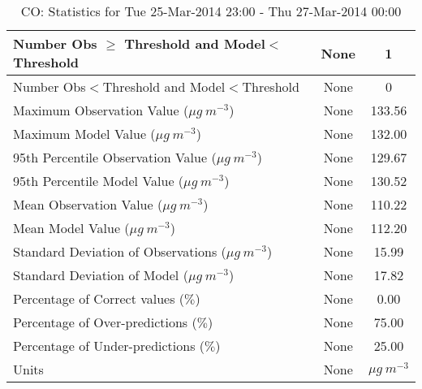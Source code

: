 \begin{table}
\begin{center}
\begin{tabular}{|l|c|c|}
 Number Obs $\geq$ Threshold and Model$<$Threshold &      None &         1 \\  \hline
 Number Obs$<$Threshold and Model$<$Threshold  &      None &         0 \\  \hline
 Maximum Observation Value ($\mu g\ m^{-3}$)   &      None &    133.56 \\  \hline
 Maximum Model Value ($\mu g\ m^{-3}$)         &      None &    132.00 \\  \hline
 95th Percentile Observation Value ($\mu g\ m^{-3}$) &      None &    129.67 \\  \hline
 95th Percentile Model Value ($\mu g\ m^{-3}$) &      None &    130.52 \\  \hline
 Mean Observation Value ($\mu g\ m^{-3}$)      &      None &    110.22 \\  \hline
 Mean Model Value ($\mu g\ m^{-3}$)            &      None &    112.20 \\  \hline
 Standard Deviation of Observations ($\mu g\ m^{-3}$) &      None &     15.99 \\  \hline
 Standard Deviation of Model ($\mu g\ m^{-3}$) &      None &     17.82 \\  \hline
 Percentage of Correct values ($\%$)           &      None &      0.00 \\  \hline
 Percentage of Over-predictions ($\%$)         &      None &     75.00 \\  \hline
 Percentage of Under-predictions ($\%$)        &      None &     25.00 \\  \hline
 Units                                         &      None &    $\mu g\ m^{-3}$ \\  \hline
    \end{tabular}
    \caption{CO: Statistics for Tue 25-Mar-2014 23:00 - Thu 27-Mar-2014 00:00}
    \label{StatsCO}
  \end{center}
\end{table}

